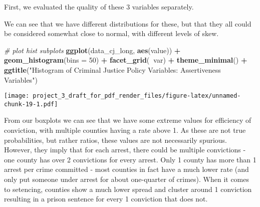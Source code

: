 \documentclass[]{article}
\newenvironment{Shaded}{\begin{snugshade}}{\end{snugshade}}
\newcommand{\CommentTok}[1]{\textcolor[rgb]{0.56,0.35,0.01}{\textit{#1}}}
\newcommand{\DataTypeTok}[1]{\textcolor[rgb]{0.13,0.29,0.53}{#1}}
\newcommand{\DecValTok}[1]{\textcolor[rgb]{0.00,0.00,0.81}{#1}}
\newcommand{\KeywordTok}[1]{\textcolor[rgb]{0.13,0.29,0.53}{\textbf{#1}}}
\newcommand{\NormalTok}[1]{#1}
\newcommand{\OperatorTok}[1]{\textcolor[rgb]{0.81,0.36,0.00}{\textbf{#1}}}
\newcommand{\StringTok}[1]{\textcolor[rgb]{0.31,0.60,0.02}{#1}}
\begin{document}
First, we evaluated the quality of these 3 variables separately.

\begin{Shaded}
\end{Shaded}

We can see that we have different distributions for these, but that they
all could be considered somewhat close to normal, with different levels
of skew.

\begin{Shaded}
\begin{Highlighting}[]
\CommentTok{# plot hist subplots}
\KeywordTok{ggplot}\NormalTok{(data_cj_long, }\KeywordTok{aes}\NormalTok{(value)) }\OperatorTok{+}
\StringTok{  }\KeywordTok{geom_histogram}\NormalTok{(}\DataTypeTok{bins =} \DecValTok{50}\NormalTok{) }\OperatorTok{+}
\StringTok{  }\KeywordTok{facet_grid}\NormalTok{(}\OperatorTok{~}\NormalTok{var) }\OperatorTok{+}
\StringTok{  }\KeywordTok{theme_minimal}\NormalTok{() }\OperatorTok{+}
\StringTok{  }\KeywordTok{ggtitle}\NormalTok{(}\StringTok{"Histogram of Criminal Justice Policy Variables: Assertiveness Variables"}\NormalTok{)}
\end{Highlighting}
\end{Shaded}

\texttt{[image: project\_3\_draft\_for\_pdf\_render\_files/figure-latex/unnamed-chunk-19-1.pdf]}

From our boxplots we can see that we have some extreme values for
efficiency of conviction, with multiple counties having a rate above 1.
As these are not true probabilities, but rather ratios, these values are
not necessarily spurious. However, they imply that for each arrest,
there could be multiple convictions - one county has over 2 convictions
for every arrest. Only 1 county has more than 1 arrest per crime
committed - most counties in fact have a much lower rate (and only put
someone under arrest for about one-quarter of crimes). When it comes to
setencing, counties show a much lower spread and cluster around 1
conviction resulting in a prison sentence for every 1 conviction that
does not.
\end{document}
